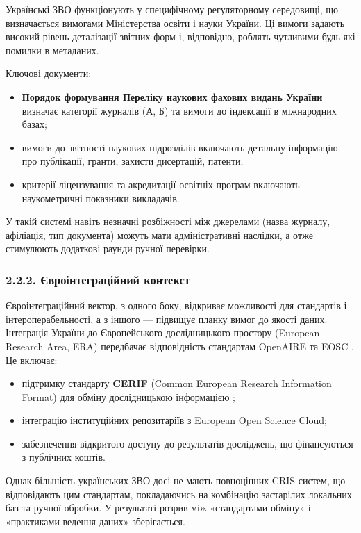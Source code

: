 Українські ЗВО функціонують у специфічному регуляторному середовищі, що визначається вимогами Міністерства освіти і науки України. Ці вимоги задають високий рівень деталізації звітних форм і, відповідно, роблять чутливими будь-які помилки в метаданих.

Ключові документи:
\begin{itemize}[leftmargin=*,itemsep=0.2em]
\item \textbf{Порядок формування Переліку наукових фахових видань України} \cite{MONUkraine2023ProfessionalJournalsOrder} визначає категорії журналів (А, Б) та вимоги до індексації в міжнародних базах;
\item вимоги до звітності наукових підрозділів включають детальну інформацію про публікації, гранти, захисти дисертацій, патенти;
\item критерії ліцензування та акредитації освітніх програм включають наукометричні показники викладачів.
\end{itemize}

У такій системі навіть незначні розбіжності між джерелами (назва журналу, афіліація, тип документа) можуть мати адміністративні наслідки, а отже стимулюють додаткові раунди ручної перевірки.

\subsubsection*{2.2.2. Євроінтеграційний контекст}

Євроінтеграційний вектор, з одного боку, відкриває можливості для стандартів і інтероперабельності, а з іншого --- підвищує планку вимог до якості даних. Інтеграція України до Європейського дослідницького простору (European Research Area, ERA) передбачає відповідність стандартам OpenAIRE та EOSC \cite{OpenAIRE2023GuidelinesCRIS}. Це включає:

\begin{itemize}[leftmargin=*,itemsep=0.2em]
\item підтримку стандарту \textbf{CERIF} (Common European Research Information Format) для обміну дослідницькою інформацією \cite{euroCRIS2024CERIF};
\item інтеграцію інституційних репозитаріїв з European Open Science Cloud;
\item забезпечення відкритого доступу до результатів досліджень, що фінансуються з публічних коштів.
\end{itemize}

Однак більшість українських ЗВО досі не мають повноцінних CRIS-систем, що відповідають цим стандартам, покладаючись на комбінацію застарілих локальних баз та ручної обробки. У результаті розрив між «стандартами обміну» і «практиками ведення даних» зберігається.

